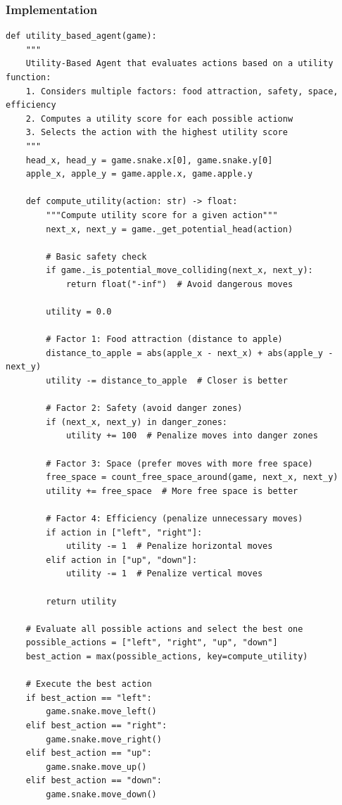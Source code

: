\documentclass[11pt,a4paper]{article}
\begin{document}
\subsubsection{Implementation}
\begin{lstlisting}[caption=Utility-Based Agent]
def utility_based_agent(game):
    """
    Utility-Based Agent that evaluates actions based on a utility function:
    1. Considers multiple factors: food attraction, safety, space, efficiency
    2. Computes a utility score for each possible actionw
    3. Selects the action with the highest utility score
    """
    head_x, head_y = game.snake.x[0], game.snake.y[0]
    apple_x, apple_y = game.apple.x, game.apple.y

    def compute_utility(action: str) -> float:
        """Compute utility score for a given action"""
        next_x, next_y = game._get_potential_head(action)

        # Basic safety check
        if game._is_potential_move_colliding(next_x, next_y):
            return float("-inf")  # Avoid dangerous moves

        utility = 0.0

        # Factor 1: Food attraction (distance to apple)
        distance_to_apple = abs(apple_x - next_x) + abs(apple_y - next_y)
        utility -= distance_to_apple  # Closer is better

        # Factor 2: Safety (avoid danger zones)
        if (next_x, next_y) in danger_zones:
            utility += 100  # Penalize moves into danger zones

        # Factor 3: Space (prefer moves with more free space)
        free_space = count_free_space_around(game, next_x, next_y)
        utility += free_space  # More free space is better

        # Factor 4: Efficiency (penalize unnecessary moves)
        if action in ["left", "right"]:
            utility -= 1  # Penalize horizontal moves
        elif action in ["up", "down"]:
            utility -= 1  # Penalize vertical moves

        return utility

    # Evaluate all possible actions and select the best one
    possible_actions = ["left", "right", "up", "down"]
    best_action = max(possible_actions, key=compute_utility)

    # Execute the best action
    if best_action == "left":
        game.snake.move_left()
    elif best_action == "right":
        game.snake.move_right()
    elif best_action == "up":
        game.snake.move_up()
    elif best_action == "down":
        game.snake.move_down()
\end{lstlisting}
\end{document}
